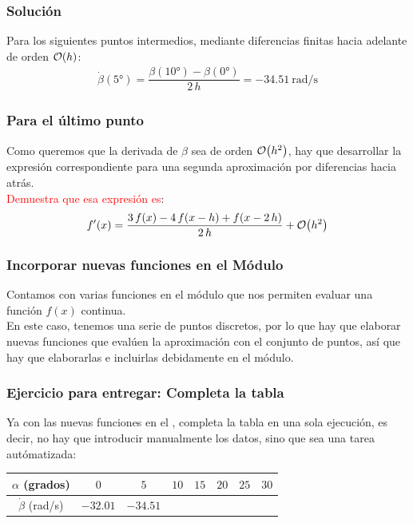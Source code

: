 \begin{frame}
\frametitle{Solución}
Para los siguientes puntos intermedios, mediante diferencias finitas hacia adelante de orden $\order{h}$:
\begin{align*}
\dot{\beta}(\ang{5}) = \dfrac{\beta(\ang{10}) - \beta(\ang{0})}{2 \, h} = \SI{-34.51}{\radian / \second}
\end{align*}
\end{frame}
\begin{frame}
\frametitle{Para el último punto}
Como queremos que la derivada de $\beta$ sea de orden $\order{h^{2}}$, hay que desarrollar la expresión correspondiente para una segunda aproximación por diferencias hacia atrás.
\\
\bigskip
\pause
\textcolor{red}{Demuestra que esa expresión es}:
\begin{align*}
\ptilde{f}(x) = \dfrac{3 \, f(x) - 4 \, f(x - h) + f(x - 2 \, h)}{2 \, h} + \order{h^{2}}
\end{align*}
\end{frame}
\begin{frame}
\frametitle{Incorporar nuevas funciones en el Módulo}
Contamos con varias funciones en el módulo  que nos permiten evaluar una función $f(x)$ continua.
\\
\bigskip
En este caso, tenemos una serie de puntos discretos, por lo que hay que elaborar nuevas funciones que evalúen la aproximación con el conjunto de puntos, así que hay que elaborarlas e incluirlas debidamente en el módulo.
\end{frame}
\begin{frame}
\frametitle{Ejercicio para entregar: Completa la tabla}
Ya con las nuevas funciones en el , completa la tabla en una sola ejecución, es decir, no hay que introducir manualmente los datos, sino que sea una tarea autómatizada:
\begin{center}
\fontsize{12}{12}\selectfont
\begin{tabular}{c | c | c | c | c | c | c | c}
$\alpha$ (grados) & $0$ & $5$ & $10$ & $15$ & $20$ & $25$ & $30$  \\ \hline
$\dot{\beta}$ (rad/s) & $-32.01$ & $-34.51$ &  &  &  &  & 
\end{tabular}
\end{center}
\end{frame}

